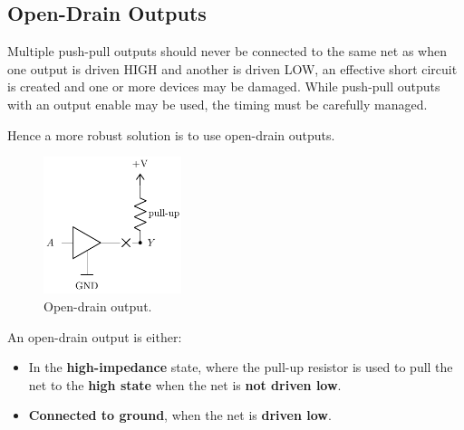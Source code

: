 \documentclass{report}
\begin{document}
\subsection{Open-Drain Outputs}
Multiple push-pull outputs should never be connected to the same net
as when one output is driven HIGH and another is driven LOW,
an effective short circuit is created and one or more devices may be damaged.
While push-pull outputs with an output enable may be used,
the timing must be carefully managed.

Hence a more robust solution is to use open-drain outputs.
\begin{figure}[H]
    \centering
    \includegraphics[height = 4cm, keepaspectratio = true]{figures/open_drain.pdf}
    \caption{Open-drain output.} %
\end{figure}
An open-drain output is either:
\begin{itemize}
    \item In the \textbf{high-impedance} state, where the pull-up resistor is used to pull the net to the \textbf{high state} when the net is \textbf{not driven low}.
    \item \textbf{Connected to ground}, when the net is \textbf{driven low}.
\end{itemize}
\end{document}
